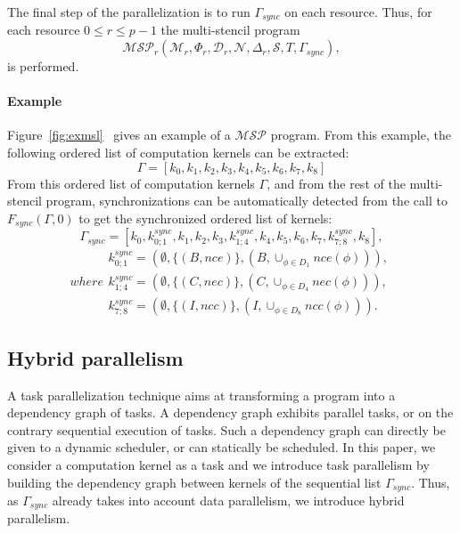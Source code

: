 \medskip

 The final step of the parallelization is to run $\Gamma_{sync}$ on each resource. Thus, for each resource $0 \leq r \leq p-1$ the multi-stencil program 
\begin{equation}
\mathcal{MSP}_r(\mathcal{M}_r,\Phi_r,\mathcal{D}_r,\mathcal{N},\Delta_r,\mathcal{S},T,\Gamma_{sync}),
\end{equation}
is performed.

\paragraph{\textbf{Example}} Figure~\ref{fig:exmsl}~ gives an example of a $\mathcal{MSP}$ program. From this example, the following ordered list of computation kernels can be extracted:
\begin{equation*}
\Gamma = [k_0,k_1,k_2,k_3,k_4,k_5,k_6,k_7,k_8]
\end{equation*}
From this ordered list of computation kernels $\Gamma$, and from the rest of the multi-stencil program, synchronizations can be automatically detected from the call to $F_{sync}(\Gamma,0)$ to get the synchronized ordered list of kernels:
\begin{equation}
\Gamma_{sync} = [k_0,k_{0;1}^{sync},k_1,k_2,k_3,k_{1;4}^{sync},k_4,k_5,k_6,k_7,k_{7;8}^{sync},k_8],
\label{eq:exsync}
\end{equation}
\begin{subequations}
where
\begin{align}
        k_{0;1}^{sync}=(\emptyset,\{(B,nce)\},(B,\cup_{\phi \in D_1} nce(\phi))),\\
        k_{1;4}^{sync}=(\emptyset,\{(C,nec)\},(C,\cup_{\phi \in D_4} nec(\phi))),\\
        k_{7;8}^{sync}=(\emptyset,\{(I,ncc)\},(I,\cup_{\phi \in D_8} ncc(\phi))).
\end{align}
\end{subequations}

\subsection{Hybrid parallelism}
A task parallelization technique aims at transforming a program into a dependency graph of tasks. A dependency graph exhibits parallel tasks, or on the contrary sequential execution of tasks.
%
Such a dependency graph can directly be given to a dynamic scheduler, or can statically be scheduled. In this paper, we consider a computation kernel as a task and we introduce task parallelism by building the dependency graph between kernels of the sequential list $\Gamma_{sync}$. Thus, as $\Gamma_{sync}$ already takes into account data parallelism, we introduce hybrid parallelism.

